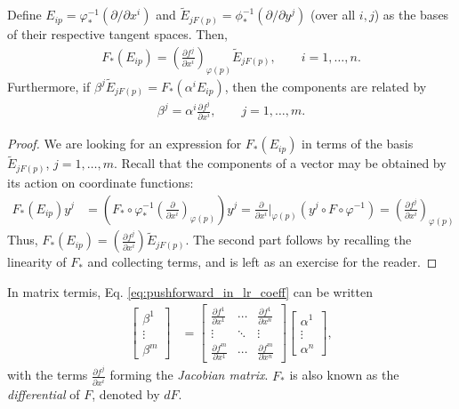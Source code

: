 \begin{thm}\label{thm:pushforward_in_lr}
Define $E_{ip} = \varphi^{-1}_* \left(\partial / \partial {x^i}\right)$ and $\tilde E_{jF(p)} = \phi^{-1}_* \left(\partial /\partial {y^j}\right)$ (over all $i, j$) as the bases of their respective tangent spaces. Then, 
\begin{align}
F_*(E_{ip}) = \left(\frac{\partial f^j}{\partial x^i}\right)_{\varphi(p)}\tilde E_{jF(p)}, \qquad i = 1, \dots, n.
\end{align}
Furthermore, if $\beta^j \tilde E_{jF(p)} = F_*(\alpha^i E_{ip})$, then the components are related by 
\begin{align}\label{eq:pushforward_in_lr_coeff}
\beta^j = \alpha^i\frac{\partial f^j}{\partial x^i}, \qquad j = 1, \dots, m.
\end{align}
\end{thm}
\begin{proof}
We are looking for an expression for $F_*(E_{ip})$ in terms of the basis $\tilde E_{jF(p)}$, $j = 1, \dots, m$. Recall that the components of a vector may be obtained by its action on coordinate functions:
\begin{equation}
\begin{aligned}
F_*(E_{ip})y^j & = \left(F_*\circ \varphi^{-1}_* \left(\frac{\partial}{\partial x^i}\right)_{\varphi(p)}\right)y^j= \frac{\partial}{\partial x^i}\biggr|_{\varphi(p)}(y^j\circ F \circ \varphi^{-1}) = \left(\frac{\partial f^j}{\partial x^i}\right)_{\varphi(p)}
\end{aligned}
\end{equation}
Thus, $F_*(E_{ip}) = \left(\frac{\partial f^j}{\partial x^i}\right) \tilde E_{jF(p)}$. The second part follows by recalling the linearity of $F_*$ and collecting terms, and is left as an exercise for the reader. 
\end{proof}

In matrix termis, Eq. \ref{eq:pushforward_in_lr_coeff} can be written 
\begin{align}\label{eq:pushforward_in_lr_matrix}
\left[ \begin{array}{c}
{\beta^1}\\
{\vdots}\\
{\beta^m}\end{array} \right] 
& = {} 
\left[\begin{array}{ccc}
\frac{\partial f^1}{\partial x^1}  & \cdots & \frac{\partial f^1}{\partial x^n}\\
\vdots & \ddots & \vdots\\
\frac{\partial f^m}{\partial x^1}  & \cdots & \frac{\partial f^m}{\partial x^n}
\end{array}\right]
\left[\begin{array}{c}
 \alpha^1\\
\vdots\\
\alpha^n
  \end{array} \right],
\end{align}
with the terms $\frac{\partial f^j}{\partial x^i}$ forming the \textit{Jacobian matrix}. $F_*$ is also known as the \textit{differential} of $F$, denoted by $dF$. 

